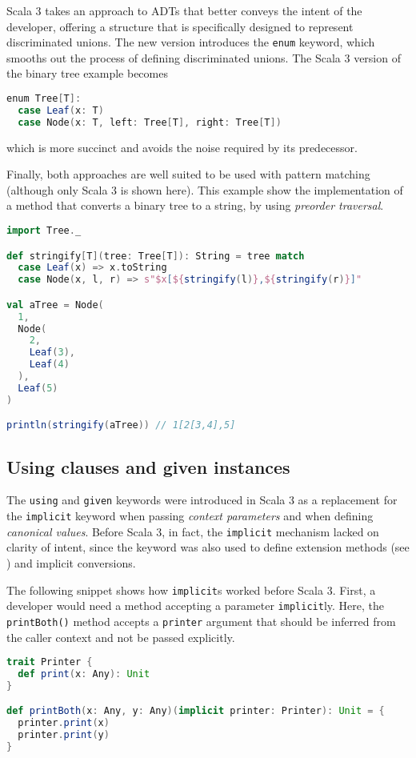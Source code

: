 Scala 3 takes an approach to ADTs that better conveys the intent of the developer, offering a structure that is specifically designed to represent discriminated unions.
%
The new version introduces the \texttt{enum} keyword, which smooths out the process of defining discriminated unions.
%
The Scala 3 version of the binary tree example becomes
%
\begin{lstlisting}[frame=single, language=scala]
enum Tree[T]:
  case Leaf(x: T)
  case Node(x: T, left: Tree[T], right: Tree[T])
\end{lstlisting}
%
which is more succinct and avoids the noise required by its predecessor.

Finally, both approaches are well suited to be used with pattern matching (although only Scala 3 is shown here).
%
This example show the implementation of a method that converts a binary tree to a string, by using \textit{preorder traversal}.
%
\begin{lstlisting}[frame=single, language=scala]
import Tree._

def stringify[T](tree: Tree[T]): String = tree match
  case Leaf(x) => x.toString
  case Node(x, l, r) => s"$x[${stringify(l)},${stringify(r)}]"

val aTree = Node(
  1,
  Node(
    2,
    Leaf(3),
    Leaf(4)
  ),
  Leaf(5)
)

println(stringify(aTree)) // 1[2[3,4],5]
\end{lstlisting}

\subsection{Using clauses and given instances}
\label{sec:given-using}

The \texttt{using} and \texttt{given} keywords were introduced in Scala 3 as a replacement for the \texttt{implicit} keyword when passing \textit{context parameters} and when defining \textit{canonical values}.
%
Before Scala 3, in fact, the \texttt{implicit} mechanism lacked on clarity of intent, since the keyword was also used to define extension methods (see ) and implicit conversions.

The following snippet shows how \texttt{implicit}s worked before Scala 3.
%
First, a developer would need a method accepting a parameter \texttt{implicit}ly.
%
Here, the \texttt{printBoth()} method accepts a \texttt{printer} argument that should be inferred from the caller context and not be passed explicitly.
%
\begin{lstlisting}[frame=single, language=scala]
trait Printer {
  def print(x: Any): Unit
}

def printBoth(x: Any, y: Any)(implicit printer: Printer): Unit = {
  printer.print(x)
  printer.print(y)
}
\end{lstlisting}

